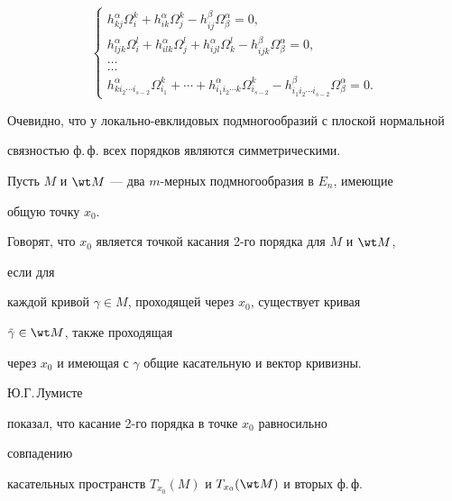 \begin{equation} 


\left\{ 


\begin{array}{l} 


h^\alpha_{kj}\Omega^k_i+h^\alpha_{ik}\Omega^k_j- 


h^\beta_{ij}\Omega^\alpha_\beta=0,\\ 


h^\alpha_{ljk}\Omega^l_i+h^\alpha_{ilk}\Omega^l_j+ 


h^\alpha_{ijl}\Omega^l_k-h^\beta_{ijk}\Omega^\alpha_\beta=0,\\ 


\dots\\


\dots\\


h^\alpha_{ki_2\dotsb i_{s-2}}\Omega^k_{i_1}+\dotsb+ 


h^\alpha_{i_1i_2\dotsb k}\Omega^k_{i_{s-2}}- 


h^\beta_{i_1i_2\dotsb i_{s-2}}\Omega^\alpha_\beta=0. 


\end{array} 


\right. 


\end{equation} 


Очевидно, что у локально-евклидовых подмногообразий с плоской нормальной 


связностью ф.\,ф. всех порядков являются симметрическими. 


 


Пусть $M$ и $\wt M$ --- два $m$-мерных подмногообразия в $E_n$, имеющие 


общую точку $x_0$. 


Говорят, что $x_0$ является точкой касания 2-го порядка для $M$ и $\wt M$, 


если для 


каждой кривой $\gamma\in M$, проходящей через $x_0$, существует кривая 


$\Tilde\gamma\in{\wt M}$, также проходящая 


через $x_0$ и имеющая с $\gamma$ общие касательную и вектор кривизны. 


Ю.Г.\,Лумисте 


\cite{Lum1} показал, что касание 2-го порядка в точке $x_0$ равносильно 


совпадению 


касательных пространств $T_{x_0}(M)$ и $T_{x_0}(\wt M)$ и вторых ф.\,ф. 


